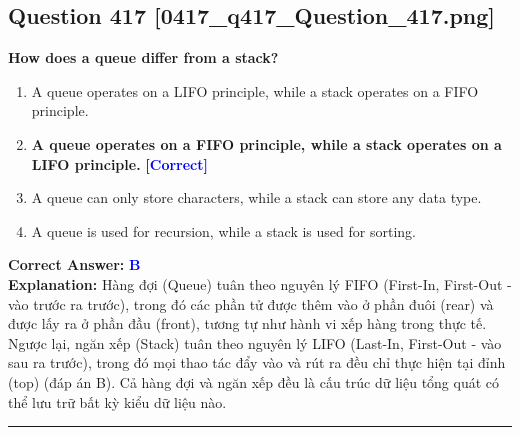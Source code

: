 \documentclass[11pt,a4paper]{article}
\begin{document}
\begin{minipage}{\textwidth}
\subsection*{Question 417 \quad \footnotesize{[0417\_q417\_Question\_417.png]}}
\noindent \textbf{How does a queue differ from a stack?}

\begin{enumerate}[label=\Alph*.]
    \item A queue operates on a LIFO principle, while a stack operates on a FIFO principle.
    \item \textbf{A queue operates on a FIFO principle, while a stack operates on a LIFO principle.} \hfill \textcolor{blue}{\textbf{[Correct]}}
    \item A queue can only store characters, while a stack can store any data type.
    \item A queue is used for recursion, while a stack is used for sorting.
\end{enumerate}

\noindent \textbf{Correct Answer:} \textcolor{blue}{\textbf{B}} \\[2pt]
\noindent \textbf{Explanation:} Hàng đợi (Queue) tuân theo nguyên lý FIFO (First-In, First-Out - vào trước ra trước), trong đó các phần tử được thêm vào ở phần đuôi (rear) và được lấy ra ở phần đầu (front), tương tự như hành vi xếp hàng trong thực tế. Ngược lại, ngăn xếp (Stack) tuân theo nguyên lý LIFO (Last-In, First-Out - vào sau ra trước), trong đó mọi thao tác đẩy vào và rút ra đều chỉ thực hiện tại đỉnh (top) (đáp án B). Cả hàng đợi và ngăn xếp đều là cấu trúc dữ liệu tổng quát có thể lưu trữ bất kỳ kiểu dữ liệu nào.

\par\vspace{0.3cm}
\hrule
\vspace{0.3cm}
\end{minipage}
\end{document}
